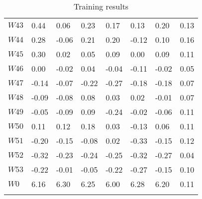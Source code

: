 \documentclass{article}
\begin{document}
\begin{longtable}{llllllll}
    $W43$ &   0.44  & 0.06  & 0.23  & 0.17  & 0.13  & 0.20  & 0.13 \\
    $W44$ &   0.28  & -0.06 & 0.21  & 0.20  & -0.12 & 0.10  & 0.16 \\
    $W45$ &   0.30  & 0.02  & 0.05  & 0.09  & 0.00  & 0.09  & 0.11 \\
    $W46$ &   0.00  & -0.02 & 0.04  & -0.04 & -0.11 & -0.02 & 0.05 \\
    $W47$ &   -0.14 & -0.07 & -0.22 & -0.27 & -0.18 & -0.18 & 0.07 \\
    $W48$ &   -0.09 & -0.08 & 0.08  & 0.03  & 0.02  & -0.01 & 0.07 \\
    $W49$ &   -0.05 & -0.09 & 0.09  & -0.24 & -0.02 & -0.06 & 0.11 \\
    $W50$ &   0.11  & 0.12  & 0.18  & 0.03  & -0.13 & 0.06  & 0.11 \\
    $W51$ &   -0.20 & -0.15 & -0.08 & 0.02  & -0.33 & -0.15 & 0.12 \\
    $W52$ &   -0.32 & -0.23 & -0.24 & -0.25 & -0.32 & -0.27 & 0.04 \\
    $W53$ &   -0.22 & -0.01 & -0.05 & -0.22 & -0.27 & -0.15 & 0.10 \\
    $W0$ &   6.16  & 6.30  & 6.25  & 6.00  & 6.28  & 6.20  & 0.11 \\
    \bottomrule
    \caption{Training results}
	\label{tab:acc}
\end{longtable}
\end{document}
